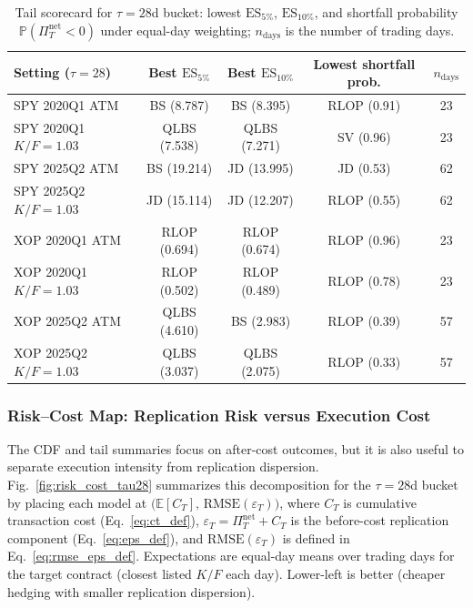 \begin{table}[t]
\centering
\small
\setlength{\tabcolsep}{5pt}
\renewcommand{\arraystretch}{1.15}

\begin{tabular}{l c c c c}
\hline
Setting ($\tau=28$) & Best $\mathrm{ES}_{5\%}$ & Best $\mathrm{ES}_{10\%}$ & Lowest shortfall prob. & $n_{\text{days}}$ \\
\hline
SPY 2020Q1 ATM           & BS (8.787)    & BS (8.395)    & RLOP (0.91) & 23 \\
SPY 2020Q1 $K/F{=}1.03$  & QLBS (7.538)  & QLBS (7.271)  & SV (0.96)   & 23 \\
SPY 2025Q2 ATM           & BS (19.214)   & JD (13.995)   & JD (0.53)   & 62 \\
SPY 2025Q2 $K/F{=}1.03$  & JD (15.114)   & JD (12.207)   & RLOP (0.55) & 62 \\
XOP 2020Q1 ATM           & RLOP (0.694)  & RLOP (0.674)  & RLOP (0.96) & 23 \\
XOP 2020Q1 $K/F{=}1.03$  & RLOP (0.502)  & RLOP (0.489)  & RLOP (0.78) & 23 \\
XOP 2025Q2 ATM           & QLBS (4.610)  & BS (2.983)    & RLOP (0.39) & 57 \\
XOP 2025Q2 $K/F{=}1.03$  & QLBS (3.037)  & QLBS (2.075)  & RLOP (0.33) & 57 \\
\hline
\end{tabular}

\caption{Tail scorecard for $\tau=28$d bucket: lowest $\mathrm{ES}_{5\%}$, $\mathrm{ES}_{10\%}$, and shortfall probability $\mathbb{P}(\Pi_T^{\mathrm{net}}<0)$ under equal-day weighting; $n_{\text{days}}$ is the number of trading days.}
\label{tab:scorecard_28d_tail}
\end{table}


\subsubsection{Risk--Cost Map: Replication Risk versus Execution Cost}
\label{subsubsec:risk_cost_map}

The CDF and tail summaries focus on after-cost outcomes, but it is also useful to separate execution intensity from replication dispersion.
Fig.~\ref{fig:risk_cost_tau28} summarizes this decomposition for the $\tau=28$d bucket by placing each model at
$\bigl(\mathbb{E}[C_T],\,\mathrm{RMSE}(\varepsilon_T)\bigr)$, where $C_T$ is cumulative transaction cost (Eq.~\eqref{eq:ct_def}),
$\varepsilon_T=\Pi_T^{\mathrm{net}}+C_T$ is the before-cost replication component (Eq.~\eqref{eq:eps_def}),
and $\mathrm{RMSE}(\varepsilon_T)$ is defined in Eq.~\eqref{eq:rmse_eps_def}.
Expectations are equal-day means over trading days for the target contract (closest listed $K/F$ each day).
Lower-left is better (cheaper hedging with smaller replication dispersion).

